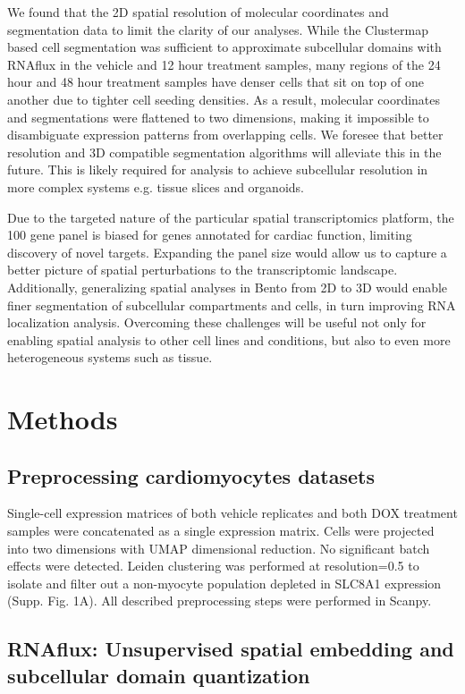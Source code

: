 We found that the 2D spatial resolution of molecular coordinates and segmentation data to limit the clarity of our analyses. While the Clustermap based cell segmentation was sufficient to approximate subcellular domains with RNAflux in the vehicle and 12 hour treatment samples, many regions of the 24 hour and 48 hour treatment samples have denser cells that sit on top of one another due to tighter cell seeding densities. As a result, molecular coordinates and segmentations were flattened to two dimensions, making it impossible to disambiguate expression patterns from overlapping cells. We foresee that better resolution and 3D compatible segmentation algorithms will alleviate this in the future. This is likely required for analysis to achieve subcellular resolution in more complex systems e.g. tissue slices and organoids.

Due to the targeted nature of the particular spatial transcriptomics platform, the 100 gene panel is biased for genes annotated for cardiac function, limiting discovery of novel targets. Expanding the panel size would allow us to capture a better picture of spatial perturbations to the transcriptomic landscape. Additionally, generalizing spatial analyses in Bento from 2D to 3D would enable finer segmentation of subcellular compartments and cells, in turn improving RNA localization analysis. Overcoming these challenges will be useful not only for enabling spatial analysis to other cell lines and conditions, but also to even more heterogeneous systems such as tissue.

\section{Methods}

\subsection{Preprocessing cardiomyocytes datasets}
Single-cell expression matrices of both vehicle replicates and both DOX treatment samples were concatenated as a single expression matrix. Cells were projected into two dimensions with UMAP dimensional reduction. No significant batch effects were detected. Leiden clustering was performed at resolution=0.5 to isolate and filter out a non-myocyte population depleted in SLC8A1 expression (Supp. Fig. 1A). All described preprocessing steps were performed in Scanpy\cite{wolfSCANPYLargescaleSinglecell2018}.

\subsection{RNAflux: Unsupervised spatial embedding and subcellular domain quantization}

